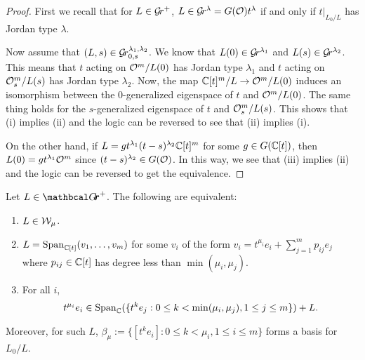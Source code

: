 \documentclass[draft]{article}
\begin{document}
\begin{proof}
First we recall that for $ L \in \mathcal{G}\!r^+$, $ L \in \mathcal{G}\!r^{\lambda} = G(\mathcal O)t^\lambda $ if and only if $ t |_{L_0/L} $ has Jordan type $ \lambda$. 

    Now assume that $ (L, s) \in \mathcal{G}\!r^{\lambda_1, \lambda_2}_{0,s}$. We know that  $ L(0) \in \mathcal{G}\!r^{\lambda_1}$ and $L(s) \in \mathcal{G}\!r^{\lambda_2} $.  This means that $t $ acting on 
    $\mathcal O^m/L(0)$ has Jordan type $ \lambda_1$ and $ t$ acting on 
    $\mathcal O_s^m/L(s)$ has Jordan type $ \lambda_2$.  Now, the map 
    $\mathbb C[t]^m/L\to \mathcal O^m/L(0)$ induces an isomorphism between the $0$-generalized eigenspace of $ t$ and $ \mathcal O^m / L(0)$.   The same thing holds for the $s$-generalized eigenspace of $t $ and $ \mathcal O_s^m/L(s)$. This shows that (i) implies (ii) and the logic can be reversed to see that (ii) implies (i).  \marginpar[]{*}
    
    On the other hand, if $ L = g t^{\lambda_1} (t-s)^{\lambda_2} \mathbb C[t]^m$ for some $ g \in G(\mathbb C[t])$, then $ L(0) = g t^{\lambda_1}\mathcal O^m $ since 
    $ (t-s)^{\lambda_2} \in G(\mathcal O)$. In this way, we see that (iii) implies (ii) and the logic can be reversed to get the equivalence.
\end{proof}

\begin{lemma} \label{le:Wmu}
    Let $ L \in \Grth^+$.  The following are equivalent:
    \begin{enumerate}
        \item $ L \in \mathcal W_\mu$.
                \item $ L = \operatorname{Span}_{\mathbb C[t]}(v_1, \dots, v_m)$ for some $ v_i $ of the form $ v_i = t^{\mu_i} e_i + \sum_{j=1}^m p_{ij} e_j $ where $ p_{ij} \in \mathbb C[t] $ has degree less than $ \min(\mu_i, \mu_j)$.
        \item  For all $ i $, 
        $$ t^{\mu_i} e_i \in \operatorname{Span}_\mathbb C(\{t^k e_j : 0 \le k < \min(\mu_i, \mu_j), 1 \le j \le m \}) + L. $$
    \end{enumerate}
    Moreover, for such $L $, $ \beta_\mu := \{ [t^k e_i] : 0 \le k < \mu_i, 1 \le i \le m\}$ forms a basis for $ L_0/L$. 
\end{lemma}

\end{document}
